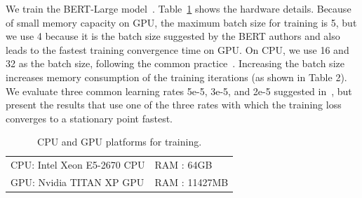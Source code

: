 We %
\textcolor{check}{train} the BERT-Large model~\cite{devlin2018bert}.  Table~\ref{tab:hw_gpu} shows the hardware details. 
Because of small memory capacity on GPU, the maximum batch size for training is 5, but \textcolor{check}{we use 4 because it is the batch size suggested by the BERT authors and also leads to the fastest training convergence time on GPU}. On CPU, we use 16 and 32 as the batch size, following the common practice~\cite{devlin2018bert}. \textcolor{check}{Increasing the batch size increases memory consumption of the training iterations (as shown in Table 2).} We evaluate three common learning rates 5e-5, 3e-5, and 2e-5 suggested in~\cite{devlin2018bert}, but present the results that use one of the three rates %
\textcolor{check}{with which the training loss converges to a stationary point fastest.}

\begin{table}[t]
\centering
\caption{\textcolor{check}{CPU and GPU platforms for training.}}
\vspace{-7pt}
\begin{tabular}{ll}
\hline
CPU: Intel Xeon E5-2670 CPU & RAM : 64GB\\ %
GPU: Nvidia TITAN XP GPU & RAM : 11427MB\\
\hline
\end{tabular}
\vspace{-5pt}
\label{tab:hw_gpu}
\end{table}

